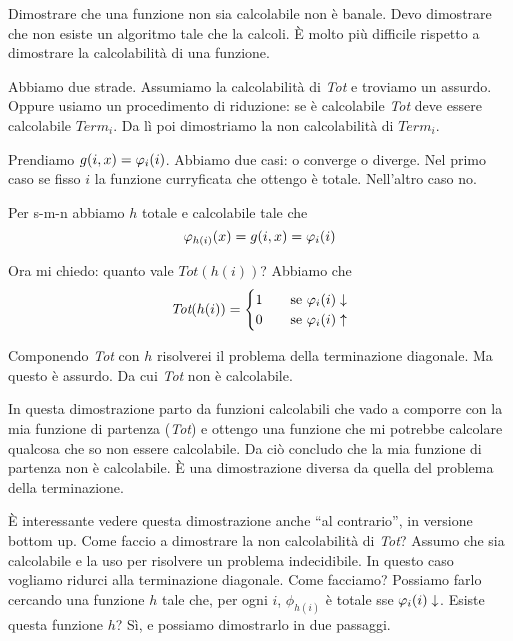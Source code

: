 Dimostrare che una funzione non sia calcolabile non è banale. Devo dimostrare che non esiste un
algoritmo tale che la calcoli. È molto più difficile rispetto a dimostrare la calcolabilità di una
funzione.

Abbiamo due strade. Assumiamo la calcolabilità di \textit{Tot} e troviamo un assurdo. Oppure usiamo
un procedimento di riduzione: se è calcolabile \textit{Tot} deve essere calcolabile
$\textit{Term}_{i}$. Da lì poi dimostriamo la non calcolabilità di $\textit{Term}_{i}$.

Prendiamo $g(i,x) = \varphi_{i}(i)$. Abbiamo due casi: o converge o diverge. Nel primo caso se fisso $i$
la funzione curryficata che ottengo è totale. Nell'altro caso no.

Per s-m-n abbiamo $h$ totale e calcolabile tale che
\begin{equation*}
    \varphi_{h(i)}(x) = g(i,x) = \varphi_{i}(i)
\end{equation*}

Ora mi chiedo: quanto vale $\textit{Tot}(h(i))$? Abbiamo che
\begin{equation*}
    \textit{Tot}(h(i))=
    \begin{cases}
        1 \quad &\text{se $\varphi_{i}(i) \downarrow$} \\
        0 \quad &\text{se $\varphi_{i}(i) \uparrow$}
    \end{cases}
\end{equation*}

Componendo \textit{Tot} con $h$ risolverei il problema della terminazione diagonale. Ma questo è
assurdo. Da cui \textit{Tot} non è calcolabile.

In questa dimostrazione parto da funzioni calcolabili che vado a comporre con la mia funzione di
partenza (\textit{Tot}) e ottengo una funzione che mi potrebbe calcolare qualcosa che so non essere
calcolabile. Da ciò concludo che la mia funzione di partenza non è calcolabile. È una
dimostrazione diversa da quella del problema della terminazione.

È interessante vedere questa dimostrazione anche ``al contrario'', in versione bottom up. Come
faccio a dimostrare la non calcolabilità di \textit{Tot}? Assumo che sia calcolabile e la uso per
risolvere un problema indecidibile. In questo caso vogliamo ridurci alla terminazione diagonale.
Come facciamo? Possiamo farlo cercando una funzione $h$ tale che, per ogni $i$, $\phi_{h(i)}$ è totale sse
$\varphi_{i}(i) \downarrow$. Esiste questa funzione $h$? Sì, e possiamo dimostrarlo in due passaggi.

